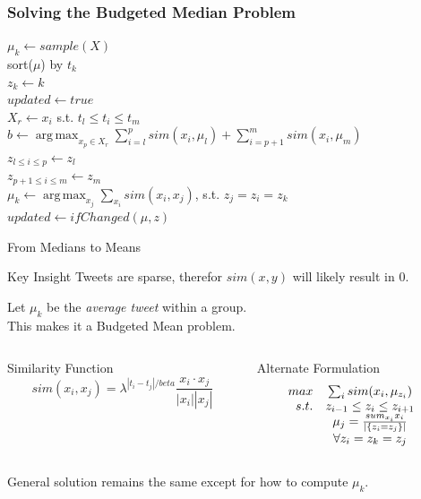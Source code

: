 \documentclass[compress]{beamer}
\DeclareMathOperator*{\argmax}{arg\,max}
\begin{document}
\begin{frame}[fragile]
\frametitle{Solving the Budgeted Median Problem}
\small{
\begin{algorithm}[H]
$\mu_k \leftarrow sample(X)$ \\
sort($\mu$) by $t_k$ \\
$z_k \leftarrow k$ \\
$updated \leftarrow true$ \\
 {
     {
        $X_r \leftarrow x_i$ s.t. $t_l \leq t_i \leq t_m$ \\
        $b \leftarrow \argmax_{x_p \in X_r} \sum_{i=l}^p sim(x_i, \mu_l) +
                                                   \sum_{i=p+1}^m sim(x_i, \mu_m)$ \\
        $z_{l \leq i \leq p} \leftarrow z_l$ \\
        $z_{p+1 \leq i \leq m} \leftarrow z_m$ \\
    }
    $\mu_k \leftarrow \argmax_{x_j} \sum_{x_i} sim(x_i, x_j)$, s.t. $z_j = z_i = z_k$ \\
    $updated \leftarrow ifChanged(\mu, z)$
}
\end{algorithm}
}
\end{frame}

\begin{frame}{From Medians to Means}

\begin{block}{Key Insight}
Tweets are sparse, therefor $sim(x,y)$ will likely result in $0$.
\end{block}

\pause

Let $\mu_k$ be the \textit{average tweet} within a group.  \\
This makes it a Budgeted Mean problem.

\begin{columns}
\begin{column}[1]{3.5cm}
Similarity Function
\[
sim(x_i, x_j) = \lambda^{|t_i - t_j|/beta} \frac{x_i \cdot x_j}{|x_i||x_j|}
\]
\end{column}
\begin{column}[2]{5cm}
Alternate Formulation
\[
\begin{array}{r c l }
max & \sum_i sim(x_i, \mu_{z_i}) & \\
s.t. & z_{i-1} \leq z_i \leq z_{i+1} & \\
& \mu_j = \frac{sum_{x_i} x_i}{|\{z_i = z_j\}|} & \\
& \forall z_i = z_k = z_j & \\
\end{array}
\]

\end{column}
\end{columns}
General solution remains the same except for how to compute $\mu_k$.
\end{frame}
\end{document}
